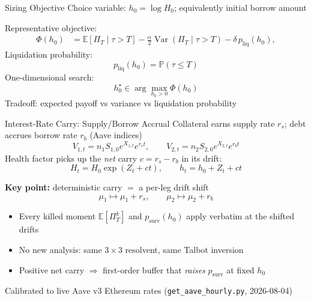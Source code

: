 \documentclass[aspectratio=169,10pt]{beamer}
\newcommand{\E}{\mathbb{E}}
\newcommand{\Pbb}{\mathbb{P}}
\newcommand{\surv}{p_{\mathrm{surv}}}
\newcommand{\liq}{p_{\mathrm{liq}}}
\begin{document}
\begin{frame}{Sizing Objective}
  Choice variable: $h_0=\log H_0$; equivalently initial borrow amount
  \vspace{0.3em}

  Representative objective:
  \[
  \begin{aligned}
    \Phi(h_0)
    &=
    \E[\Pi_T\mid \tau>T]
    -\frac{\alpha}{2}\operatorname{Var}(\Pi_T\mid \tau>T)
    -\delta\,\liq(h_0),
  \end{aligned}
  \]
  Liquidation probability:
  \[
    \liq(h_0)=\Pbb(\tau\leq T)
  \]
  One-dimensional search:
  \[
    h_0^\star\in\arg\max_{h_0>0}\Phi(h_0)
  \]
  Tradeoff: expected payoff vs variance vs liquidation probability
\end{frame}

\begin{frame}{Interest-Rate Carry: Supply/Borrow Accrual}
  \small
  Collateral earns supply rate $r_s$; debt accrues borrow rate $r_b$ (Aave indices)
  \[
    V_{1,t}=n_1S_{1,0}e^{X_{1,t}}e^{r_st},
    \qquad
    V_{2,t}=n_2S_{2,0}e^{X_{2,t}}e^{r_bt}
  \]
  Health factor picks up the \emph{net} carry $c=r_s-r_b$ in its drift:
  \[
    H_t=H_0\exp(Z_t+ct),
    \qquad
    h_t=h_0+Z_t+ct
  \]
  \vspace{0.15em}

  \textbf{Key point:} deterministic carry $=$ a per-leg drift shift
  \[
    \mu_1\mapsto\mu_1+r_s,
    \qquad
    \mu_2\mapsto\mu_2+r_b
  \]
  \begin{itemize}
    \item Every killed moment $\E[\Pi_T^k]$ and $\surv(h_0)$ apply verbatim at the shifted drifts
    \item No new analysis: same $3\times3$ resolvent, same Talbot inversion
    \item Positive net carry $\Rightarrow$ first-order buffer that \emph{raises} $\surv$ at fixed $h_0$
  \end{itemize}
  \vspace{0.15em}

  {\scriptsize Calibrated to live Aave v3 Ethereum rates (\texttt{get\_aave\_hourly.py}, 2026-08-04)}
\end{frame}
\end{document}
